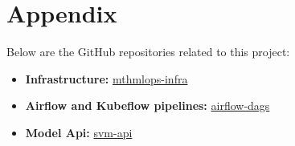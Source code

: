 \newpage
\section*{Appendix}
Below are the GitHub repositories related to this project:
\begin{itemize}
    \item \textbf{Infrastructure:} \href{https://github.com/Baylib/mthmlops-infra}{mthmlops-infra}
    \item \textbf{Airflow and Kubeflow pipelines:} \href{https://github.com/Baylib/airflow-dags}{airflow-dags}
    \item \textbf{Model Api:} \href{https://github.com/Baylib/svm-api}{svm-api}
\end{itemize}